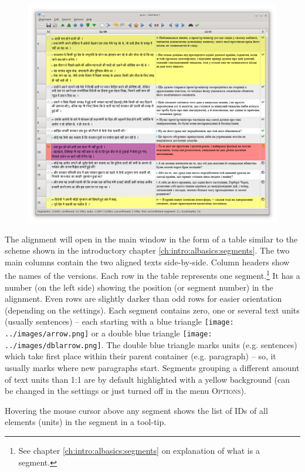 \documentclass[a4paper,10pt,oneside]{book}
\newcommand{\menu}[1]{\textsc{#1}}
\begin{document}
\begin{figure}[htbf]
 \includegraphics[width=\textwidth]{screenshots/mainwindow.png}
\end{figure}


The alignment will open in the main window in the form of a table similar to the scheme shown in the introductory chapter \ref{ch:intro:albasics:segments}. The two main columns contain the two aligned texts side-by-side. Column headers show the names of the versions. Each row in the table represents one segment.\footnote{See chapter \ref{ch:intro:albasics:segments} on explanation of what is a segment.} It has a number (on the left side) showing the position (or segment number) in the alignment. Even rows are slightly darker than odd rows for easier orientation (depending on the settings). Each segment contains zero, one or several text units (usually sentences) -- each starting with a blue triangle \texttt{[image: ../images/arrow.png]} or a double blue triangle \texttt{[image: ../images/dblarrow.png]}. The double blue triangle marks units (e.g. sentences) which take first place within their parent container (e.g. paragraph) -- so, it usually marks where new paragraphs start. Segments grouping a different amount of text units than 1:1 are by default highlighted with a yellow background (can be changed in the settings or just turned off in the menu \menu{Options}).

Hovering the mouse cursor above any segment shows the list of IDs of all elements (units) in the segment in a tool-tip.
\end{document}
